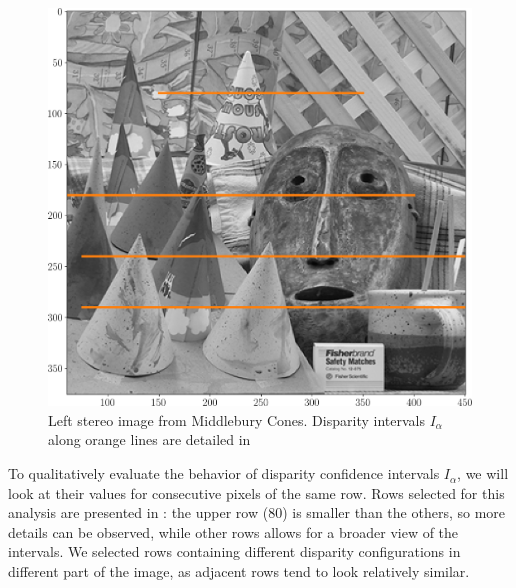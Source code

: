 \begin{figure}
    \centering
    \includegraphics[width=0.5\linewidth]{Images/Chap_5/cones_with_rows.png}
    \caption{Left stereo image from Middlebury Cones. Disparity intervals $I_\alpha$ along orange lines are detailed in }
    \label{fig:cones_with_rows}
\end{figure}

To qualitatively evaluate the behavior of disparity confidence intervals $I_\alpha$, we will look at their values for consecutive pixels of the same row. Rows selected for this analysis are presented in : the upper row ($80$) is smaller than the others, so more details can be observed, while other rows allows for a broader view of the intervals. We selected rows containing different disparity configurations in different part of the image, as adjacent rows tend to look relatively similar.

